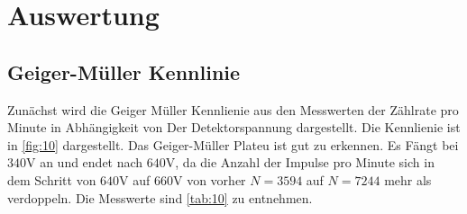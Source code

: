 \section{Auswertung}
\label{sec:Auswertung}
\subsection{Geiger-Müller Kennlinie}
Zunächst wird die Geiger Müller Kennlienie aus den Messwerten 
der Zählrate pro Minute in Abhängigkeit von Der Detektorspannung
dargestellt. Die Kennlienie ist in \autoref{fig:10} dargestellt. 
Das Geiger-Müller Plateu ist gut zu erkennen. Es Fängt bei 
$340\unit{\volt}$ an und endet nach $640\unit{\volt}$, da die Anzahl 
der Impulse pro Minute sich in dem Schritt von $640\unit{\volt}$ auf $660\unit{\volt}$
von vorher $N=3594$ auf $N=7244$ mehr als verdoppeln. Die Messwerte sind 
\autoref{tab:10} zu entnehmen. 

